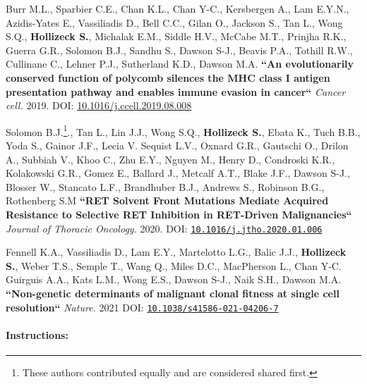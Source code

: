 {Burr M.L., Sparbier C.E., Chan K.L., Chan Y-C., Kersbergen A., Lam E.Y.N., Azidis-Yates E., Vassiliadis D., Bell C.C., Gilan O., Jackson S., Tan L., Wong S.Q., \textbf{Hollizeck S.}, Michalak E.M., Siddle H.V.,  McCabe M.T., Prinjha R.K., Guerra G.R., Solomon B.J., Sandhu S.,  Dawson S-J., Beavis P.A., Tothill R.W., Cullinane C., Lehner P.J., Sutherland K.D., Dawson M.A. \textbf{``An evolutionarily conserved function of polycomb silences the MHC class I antigen presentation pathway and enables immune evasion in cancer``} \textit{Cancer cell.} 2019. DOI: \href{https://doi.org/10.1016/j.ccell.2019.08.008}{10.1016/j.ccell.2019.08.008}

Solomon B.J.\footnote{These authors contributed equally and are considered shared first.}., Tan L.\footnotemark[\value{footnote}], Lin J.J.\footnotemark[\value{footnote}], Wong S.Q.\footnotemark[\value{footnote}], \textbf{Hollizeck S.}\footnotemark[\value{footnote}], Ebata K., Tuch B.B., Yoda S., Gainor J.F., Lecia V. Sequist L.V., Oxnard G.R., Gautschi O., Drilon A., Subbiah V., Khoo C., Zhu E.Y., Nguyen M., Henry D., Condroski K.R., Kolakowski G.R., Gomez E., Ballard J., Metcalf A.T., Blake J.F., Dawson S-J., Blosser W., Stancato L.F., Brandhuber B.J., Andrews S., Robinson B.G., Rothenberg S.M
\textbf{``RET Solvent Front Mutations Mediate Acquired Resistance to Selective RET Inhibition in RET-Driven Malignancies``}
\textit{Journal of Thoracic Oncology.} 2020. DOI: \href{https://doi.org/10.1016/j.jtho.2020.01.006}{\nolinkurl{10.1016/j.jtho.2020.01.006}}

Fennell K.A.\footnotemark[\value{footnote}], Vassiliadis D.\footnotemark[\value{footnote}], Lam E.Y., Martelotto L.G., Balic J.J., \textbf{Hollizeck S.}, Weber T.S., Semple T., Wang Q., Miles D.C., MacPherson L., Chan Y-C. Guirguis A.A., Kats L.M., Wong E.S., Dawson S-J., Naik S.H., Dawson M.A. \textbf{``Non-genetic determinants of malignant clonal fitness at single cell resolution``} \textit{Nature.} 2021 DOI: \href{https://doi.org/10.1038/s41586-021-04206-7}{\nolinkurl{10.1038/s41586-021-04206-7}}



\hrulefill

\paragraph{Instructions:}

}
